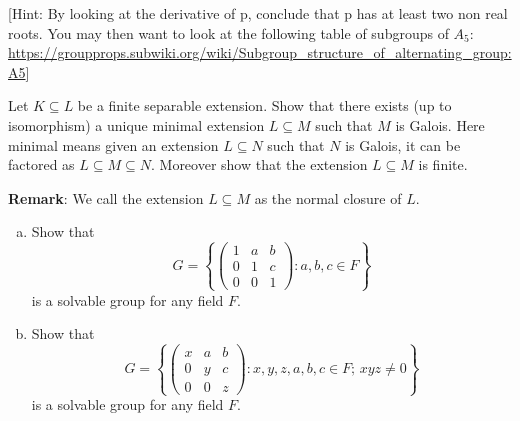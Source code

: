 \documentclass[12pt,a4paper]{article}
\begin{document}
{}

[Hint: By looking at the derivative of p, conclude that p has at least two non real roots. You may then want to look at the following table of subgroups of $A_5$: \url{https://groupprops.subwiki.org/wiki/Subgroup_structure_of_alternating_group:A5}]

\item 
Let $K\subseteq L$ be a finite separable extension. Show that there exists (up to isomorphism) a unique minimal extension $L\subseteq M$ such that $M$ is Galois. Here minimal means given an extension $L\subseteq N$ such that $N$ is Galois, it can be factored as $L\subseteq M\subseteq N$.  Moreover show that the extension $L\subseteq M$ is finite.

\textbf{Remark}: We call the extension $L\subseteq M$ as the normal closure of $L$.

\item
   \begin{enumerate}[a)]
  \item 
 Show that
 \begin{displaymath}
   G = \left\{
     \begin{pmatrix}
       1 & a & b \\
       0 & 1 & c \\
       0 & 0 & 1
     \end{pmatrix} \colon a,b,c \in F \right\}
\end{displaymath}
is a solvable group for any field $F$.
\item
Show that
 \begin{displaymath}
   G = \left\{
     \begin{pmatrix}
       x & a & b \\
       0 & y & c \\
       0 & 0 & z
     \end{pmatrix} \colon x,y,z,a,b,c \in F; \, xyz \neq 0 \right\}
\end{displaymath}
is a solvable group for any field $F$.
\end{enumerate}
\end{document}
